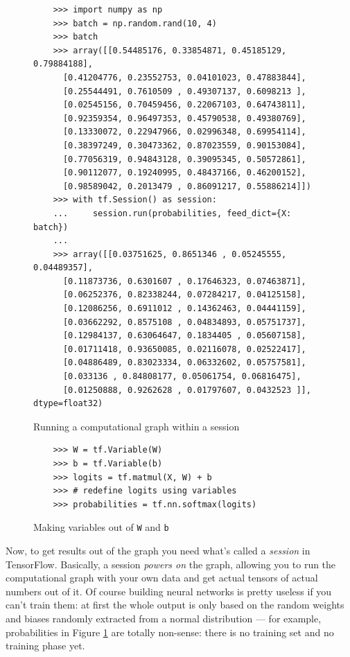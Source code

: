 \begin{figure}
  \begin{verbatim}
    >>> import numpy as np
    >>> batch = np.random.rand(10, 4)
    >>> batch
    >>> array([[0.54485176, 0.33854871, 0.45185129, 0.79884188],
      [0.41204776, 0.23552753, 0.04101023, 0.47883844],
      [0.25544491, 0.7610509 , 0.49307137, 0.6098213 ],
      [0.02545156, 0.70459456, 0.22067103, 0.64743811],
      [0.92359354, 0.96497353, 0.45790538, 0.49380769],
      [0.13330072, 0.22947966, 0.02996348, 0.69954114],
      [0.38397249, 0.30473362, 0.87023559, 0.90153084],
      [0.77056319, 0.94843128, 0.39095345, 0.50572861],
      [0.90112077, 0.19240995, 0.48437166, 0.46200152],
      [0.98589042, 0.2013479 , 0.86091217, 0.55886214]])
    >>> with tf.Session() as session:
    ...     session.run(probabilities, feed_dict={X: batch})
    ...
    >>> array([[0.03751625, 0.8651346 , 0.05245555, 0.04489357],
      [0.11873736, 0.6301607 , 0.17646323, 0.07463871],
      [0.06252376, 0.82338244, 0.07284217, 0.04125158],
      [0.12086256, 0.6911012 , 0.14362463, 0.04441159],
      [0.03662292, 0.8575108 , 0.04834893, 0.05751737],
      [0.12984137, 0.63064647, 0.1834405 , 0.05607158],
      [0.01711418, 0.93650085, 0.02116078, 0.02522417],
      [0.04886489, 0.83023334, 0.06332602, 0.05757581],
      [0.033136 , 0.84808177, 0.05061754, 0.06816475],
      [0.01250888, 0.9262628 , 0.01797607, 0.0432523 ]], dtype=float32)
  \end{verbatim}
  \caption{Running a computational graph within a session}
  \label{fig:use-session}
\end{figure}

\begin{figure}
  \begin{verbatim}
    >>> W = tf.Variable(W)
    >>> b = tf.Variable(b)
    >>> logits = tf.matmul(X, W) + b
    >>> # redefine logits using variables 
    >>> probabilities = tf.nn.softmax(logits)
  \end{verbatim}
  \caption{Making variables out of \texttt{W} and \texttt{b}}
  \label{fig:making-variables}
\end{figure}

Now, to get results out of the graph you need what's called a
\emph{session} in TensorFlow. Basically, a session \emph{powers on} the
graph, allowing you to run the computational graph with your own data
and get actual tensors of actual numbers out of it. Of course building
neural networks is pretty useless if you can't train them: at first the
whole output is only based on the random weights and biases randomly
extracted from a normal distribution --- for example, probabilities in
Figure \ref{fig:use-session} are totally non-sense: there is no training
set and no training phase yet.

